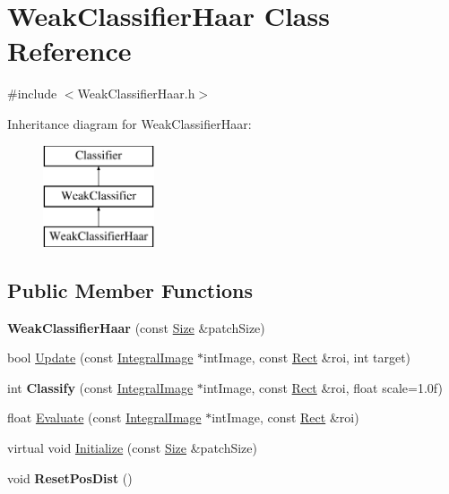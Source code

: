 \hypertarget{classWeakClassifierHaar}{}\section{Weak\+Classifier\+Haar Class Reference}
\label{classWeakClassifierHaar}


{\ttfamily \#include $<$Weak\+Classifier\+Haar.\+h$>$}

Inheritance diagram for Weak\+Classifier\+Haar\+:\begin{figure}[H]
\begin{center}
\leavevmode
\includegraphics[height=3.000000cm]{classWeakClassifierHaar}
\end{center}
\end{figure}
\subsection*{Public Member Functions}
\begin{DoxyCompactItemize}
\item 
\hypertarget{classWeakClassifierHaar_a5897c0e554cb8e3dd0cb001bb76a3c93}{}{\bfseries Weak\+Classifier\+Haar} (const \hyperlink{classSize}{Size} \&patch\+Size)\label{classWeakClassifierHaar_a5897c0e554cb8e3dd0cb001bb76a3c93}

\item 
bool \hyperlink{classWeakClassifierHaar_aa8dc6734dc435c246d9605aceea2c9a7}{Update} (const \hyperlink{classIntegralImage}{Integral\+Image} $\ast$int\+Image, const \hyperlink{classRect}{Rect} \&roi, int target)
\item 
\hypertarget{classWeakClassifierHaar_a2b7ad8b6691f6739ebe75c5301fa252b}{}int {\bfseries Classify} (const \hyperlink{classIntegralImage}{Integral\+Image} $\ast$int\+Image, const \hyperlink{classRect}{Rect} \&roi, float scale=1.\+0f)\label{classWeakClassifierHaar_a2b7ad8b6691f6739ebe75c5301fa252b}

\item 
float \hyperlink{classWeakClassifierHaar_a5880dbf4a75a29e61e32903faef1dae6}{Evaluate} (const \hyperlink{classIntegralImage}{Integral\+Image} $\ast$int\+Image, const \hyperlink{classRect}{Rect} \&roi)
\item 
virtual void \hyperlink{classWeakClassifierHaar_ac5e1a9ff691bd0dcf9174af88cc9dc1f}{Initialize} (const \hyperlink{classSize}{Size} \&patch\+Size)
\item 
\hypertarget{classWeakClassifierHaar_ac577e6b2c75eb48bc93068966c522f3f}{}void {\bfseries Reset\+Pos\+Dist} ()\label{classWeakClassifierHaar_ac577e6b2c75eb48bc93068966c522f3f}

\end{DoxyCompactItemize}


